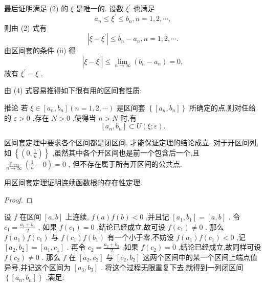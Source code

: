 最后证明满足 (2) 的 \(\xi\) 是唯一的. 设数 \({\xi }^{\prime }\) 也满足
\[
{a}_{n} \leq  {\xi }^{\prime } \leq  {b}_{n},n = 1,2,\cdots ,
\]
则由 (2) 式有
\[
\left| {\xi  - {\xi }^{\prime }}\right|  \leq  {b}_{n} - {a}_{n},n = 1,2,\cdots .
\]
由区间套的条件 (ii) 得
\[
\left| {\xi  - {\xi }^{\prime }}\right|  \leq  \mathop{\lim }\limits_{{n \rightarrow  \infty }}\left( {{b}_{n} - {a}_{n}}\right)  = 0,
\]
故有 \({\xi }^{\prime } = \xi\) .

由 (4) 式容易推得如下很有用的区间套性质:

推论 若 \(\xi  \in  \left\lbrack  {{a}_{n},{b}_{n}}\right\rbrack  \left( {n = 1,2,\cdots }\right)\) 是区间套 \(\left\{  \left\lbrack  {{a}_{n},{b}_{n}}\right\rbrack  \right\}\) 所确定的点,则对任给的 \(\varepsilon  > 0\) ,存在 \(N > 0\) ,使得当 \(n > N\) 时,有
\[
\left\lbrack  {{a}_{n},{b}_{n}}\right\rbrack   \subset  U\left( {\xi ;\varepsilon }\right) .
\]
\begin{remark}

\end{remark}
区间套定理中要求各个区间都是闭区间, 才能保证定理的结论成立. 对于开区间列,如 \(\left\{  \left( {0,\frac{1}{n}}\right) \right\}\) ,虽然其中各个开区间也是前一个包含后一个,且 \(\mathop{\lim }\limits_{{n \rightarrow  \infty }}\left( {\frac{1}{n} - 0}\right)  = 0\) , 但不存在属于所有开区间的公共点.

\begin{example}

\end{example}
用区间套定理证明连续函数根的存在性定理.

\begin{proof}

\end{proof}
设 \(f\) 在区间 \(\left\lbrack  {a,b}\right\rbrack\) 上连续, \(f\left( a\right) f\left( b\right)  < 0\) ,并且记 \(\left\lbrack  {{a}_{1},{b}_{1}}\right\rbrack   = \left\lbrack  {a,b}\right\rbrack\) . 令 \({c}_{1} = \frac{{a}_{1} + {b}_{1}}{2}\) , 如果 \(f\left( {c}_{1}\right)  = 0\) ,结论已经成立,故可设 \(f\left( {c}_{1}\right)  \neq  0\) . 那么 \(f\left( {a}_{1}\right) f\left( {c}_{1}\right)\) 与 \(f\left( {c}_{1}\right) f\left( {b}_{1}\right)\) 有一个小于零,不妨设 \(f\left( {a}_{1}\right) f\left( {c}_{1}\right)  < 0\) ,记 \(\left\lbrack  {{a}_{2},{b}_{2}}\right\rbrack   = \left\lbrack  {{a}_{1},{c}_{1}}\right\rbrack\) . 再令 \({c}_{2} = \frac{{a}_{2} + {b}_{2}}{2}\) ,如果 \(f\left( {c}_{2}\right)  = 0\) ,结论已经成立,故同样可设 \(f\left( {c}_{2}\right)  \neq  0\) . 那么 \(f\) 在 \(\left\lbrack  {{a}_{2},{c}_{2}}\right\rbrack\) 与 \(\left\lbrack  {{c}_{2},{b}_{2}}\right\rbrack\) 这两个区间中的某一个区间上端点值异号,并记这个区间为 \(\left\lbrack  {{a}_{3},{b}_{3}}\right\rbrack\) . 将这个过程无限重复下去,就得到一列闭区间 \(\left\{  \left\lbrack  {{a}_{n},{b}_{n}}\right\rbrack  \right\}\) ,满足:

